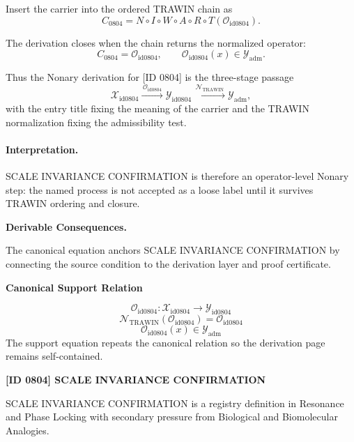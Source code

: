 Insert the carrier into the ordered TRAWIN chain as\[
C_{0804}=N\circ I\circ W\circ A\circ R\circ T(\mathcal{O}_{\mathrm{id0804}}).
\]

The derivation closes when the chain returns the normalized operator:\[
C_{0804}=\mathcal{O}_{\mathrm{id0804}},\qquad \mathcal{O}_{\mathrm{id0804}}(x)\in\mathcal{Y}_{\mathrm{adm}}.
\]

Thus the Nonary derivation for [ID 0804] is the three-stage passage
\[
\mathcal{X}_{\mathrm{id0804}}\xrightarrow{\,\mathcal{O}_{\mathrm{id0804}}\,} \mathcal{Y}_{\mathrm{id0804}}\xrightarrow{\,\mathcal{N}_{\mathrm{TRAWIN}}\,} \mathcal{Y}_{\mathrm{adm}},
\]
with the entry title fixing the meaning of the carrier and the TRAWIN normalization fixing the admissibility test.

\paragraph{Interpretation.} SCALE INVARIANCE CONFIRMATION is therefore an operator-level Nonary step: the named process is not accepted as a loose label until it survives TRAWIN ordering and closure.

\par\vspace{0.35em}
\noindent\textbf{Derivable Consequences.}\quad
\begingroup
\footnotesize
\raggedright
The canonical equation anchors SCALE INVARIANCE CONFIRMATION by connecting the source condition to the derivation layer and proof certificate.
\par\endgroup

\noindent\textbf{Canonical Support Relation}\par
\[
\mathcal{O}_{\mathrm{id0804}}:\mathcal{X}_{\mathrm{id0804}}\longrightarrow\mathcal{Y}_{\mathrm{id0804}}
\]
\[
\mathcal{N}_{\mathrm{TRAWIN}}(\mathcal{O}_{\mathrm{id0804}})=\mathcal{O}_{\mathrm{id0804}}
\]
\[
\mathcal{O}_{\mathrm{id0804}}(x)\in\mathcal{Y}_{\mathrm{adm}}
\]
\noindent The support equation repeats the canonical relation so the derivation page remains self-contained.\par

\clearpage
\noindent\textbf{[ID 0804] SCALE INVARIANCE CONFIRMATION}\par
\vspace{0.35em}
\begingroup\small
{}
SCALE INVARIANCE CONFIRMATION is a registry definition in Resonance and Phase Locking with secondary pressure from Biological and Biomolecular Analogies.

